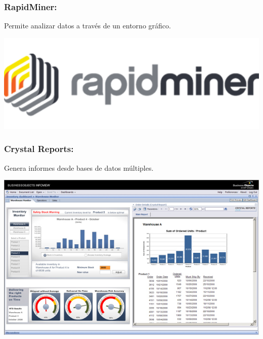 \subsubsection{RapidMiner: }\label{sec:nada2}  
Permite analizar datos a través de un entorno gráfico.
	\begin{center}
	\includegraphics[width=15cm]{./Imagenes/BIimagen16}
	\end{center}
	
\subsubsection{Crystal Reports: }\label{sec:nada2}  
Genera informes desde bases de datos múltiples.
	\begin{center}
	\includegraphics[width=15cm]{./Imagenes/BIimagen17}
	\end{center}
	

